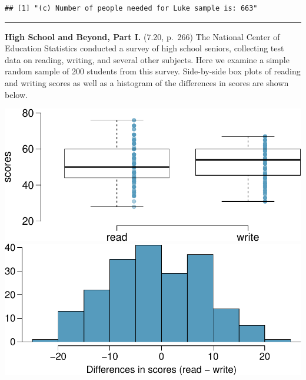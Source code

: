 \documentclass[]{article}
\newenvironment{Shaded}{\begin{snugshade}}{\end{snugshade}}
\newcommand{\CommentTok}[1]{\textcolor[rgb]{0.56,0.35,0.01}{\textit{#1}}}
\newcommand{\DataTypeTok}[1]{\textcolor[rgb]{0.13,0.29,0.53}{#1}}
\newcommand{\DecValTok}[1]{\textcolor[rgb]{0.00,0.00,0.81}{#1}}
\newcommand{\FloatTok}[1]{\textcolor[rgb]{0.00,0.00,0.81}{#1}}
\newcommand{\KeywordTok}[1]{\textcolor[rgb]{0.13,0.29,0.53}{\textbf{#1}}}
\newcommand{\NormalTok}[1]{#1}
\newcommand{\OperatorTok}[1]{\textcolor[rgb]{0.81,0.36,0.00}{\textbf{#1}}}
\newcommand{\StringTok}[1]{\textcolor[rgb]{0.31,0.60,0.02}{#1}}
\begin{document}
\begin{Shaded}
\end{Shaded}

\begin{verbatim}
## [1] "(c) Number of people needed for Luke sample is: 663"
\end{verbatim}

\begin{center}\rule{0.5\linewidth}{\linethickness}\end{center}

\clearpage

\textbf{High School and Beyond, Part I.} (7.20, p.~266) The National
Center of Education Statistics conducted a survey of high school
seniors, collecting test data on reading, writing, and several other
subjects. Here we examine a simple random sample of 200 students from
this survey. Side-by-side box plots of reading and writing scores as
well as a histogram of the differences in scores are shown below.

\includegraphics[width=0.5\linewidth]{Homework_7_files/figure-latex/unnamed-chunk-4-1}
\includegraphics[width=0.5\linewidth]{Homework_7_files/figure-latex/unnamed-chunk-4-2}
\end{document}
